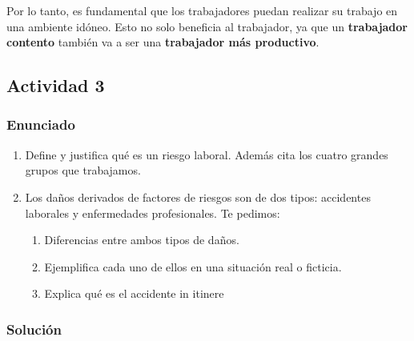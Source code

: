 Por lo tanto, es fundamental que los trabajadores puedan realizar su trabajo en una ambiente idóneo. Esto no solo beneficia al trabajador, ya que un \textbf{trabajador contento} también va a ser una \textbf{trabajador más productivo}.

\subsection{Actividad 3}

\subsubsection{Enunciado}

\begin{enumerate}[label=\alph*)]
    \item Define y justifica qué es un riesgo laboral. Además cita los cuatro grandes grupos que trabajamos.
    \item Los daños derivados de factores de riesgos son de dos tipos: accidentes laborales y enfermedades profesionales. Te pedimos:
    \begin{enumerate}
        \item Diferencias entre ambos tipos de daños.
        \item Ejemplifica cada uno de ellos en una situación real o ficticia.
        \item Explica qué es el accidente in itinere
    \end{enumerate}
\end{enumerate}

\subsubsection{Solución}


